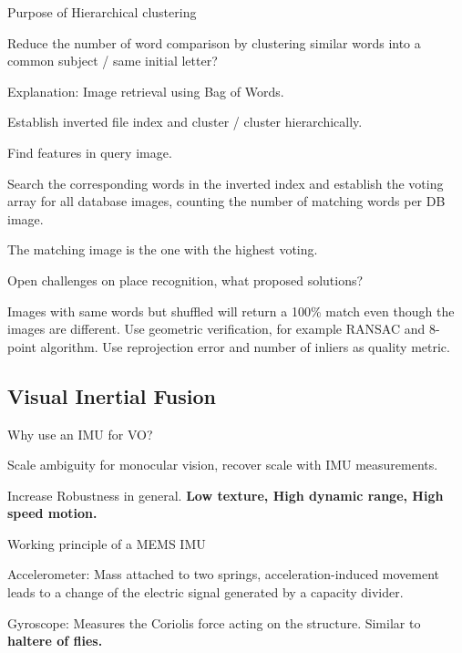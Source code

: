 \documentclass[10pt,a4paper]{scrartcl}
\begin{document}
\begin{multicols*}{2}
\begin{QandA}
{Purpose of Hierarchical clustering}
\item Reduce the number of word comparison by clustering similar words into a common subject / same initial letter?
\end{QandA}

\begin{QandA}
{Explanation: Image retrieval using Bag of Words.}
\item Establish inverted file index and cluster / cluster hierarchically.
\item Find features in query image.
\item Search the corresponding words in the inverted index and establish the voting array for all database images, counting the number of matching words per DB image.
\item The matching image is the one with the highest voting.
\end{QandA}

\begin{QandA}
{Open challenges on place recognition, what proposed solutions?}
\item Images with same words but shuffled will return a 100\% match even though the images are different. Use geometric verification, for example RANSAC and 8-point algorithm. Use reprojection error and number of inliers as quality metric.
\end{QandA}

\subsection*{Visual Inertial Fusion}

\begin{QandA}
{Why use an IMU for VO?}
\item Scale ambiguity for monocular vision, recover scale with IMU measurements.
\item Increase Robustness in general. \textbf{Low texture, High dynamic range, High speed motion.}
\end{QandA}

\begin{QandA}
{Working principle of a MEMS IMU}
\item Accelerometer: Mass attached to two springs, acceleration-induced movement leads to a change of the electric signal generated by a capacity divider.
\item Gyroscope: Measures the Coriolis force acting on the structure. Similar to \textbf{haltere of flies.}
\end{QandA}


\end{multicols*}
\end{document}
